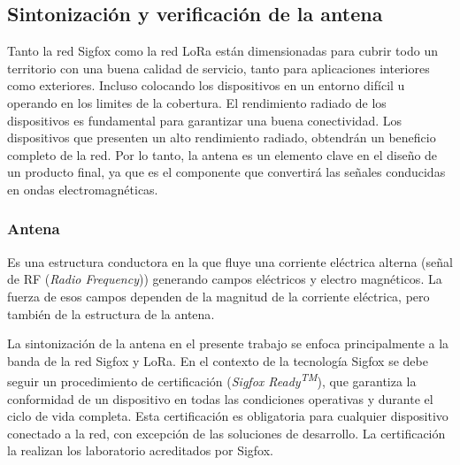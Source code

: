 

	
		

		
		
		
		


%


\subsection{Sintonización y verificación de la antena}
\label{subseccionAntena}
Tanto la red Sigfox como la red LoRa están dimensionadas para cubrir todo un territorio con una buena
calidad de servicio, tanto para aplicaciones interiores como exteriores. Incluso colocando los dispositivos en un entorno difícil u operando en los limites de la cobertura.
El rendimiento radiado de los dispositivos es fundamental para garantizar una buena conectividad. Los dispositivos que presenten un alto rendimiento radiado, obtendrán un beneficio completo de la red. Por lo tanto, la antena es un elemento clave en el diseño de un producto final, ya que es el componente que convertirá las señales conducidas en ondas electromagnéticas.

\subsubsection{Antena}
Es una estructura conductora en la que fluye una corriente eléctrica alterna (señal de RF (\textit{Radio Frequency})) generando campos eléctricos y electro magnéticos. La fuerza de esos campos dependen de la magnitud de la corriente eléctrica, pero también de la estructura de la antena\citep{AntenaSigFox2016}.

La sintonización de la antena en el presente trabajo se enfoca principalmente a la banda de la red Sigfox y LoRa. En el contexto de la tecnología Sigfox se debe seguir un procedimiento de certificación (\textit{Sigfox Ready\textsuperscript{TM}}), que garantiza la conformidad de un dispositivo en todas las condiciones operativas y durante el ciclo de vida completa. Esta certificación es obligatoria para cualquier dispositivo conectado a la red, con excepción de las soluciones de desarrollo. La certificación la realizan los laboratorio acreditados por Sigfox\citep{CertificationSigfox}.

